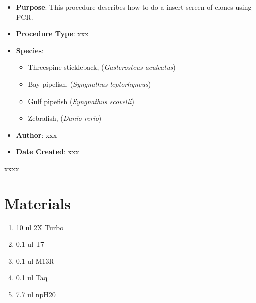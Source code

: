 \documentclass[
  letterpaper,
  DIV=11,
  numbers=noendperiod]{scrreprt}
\providecommand{\tightlist}{%
  \setlength{\itemsep}{0pt}\setlength{\parskip}{0pt}}\usepackage{longtable,booktabs,array}
\begin{document}
\begin{itemize}
\tightlist
\item
  \textbf{Purpose}: This procedure describes how to do a insert screen
  of clones using PCR.
\item
  \textbf{Procedure Type}: xxx
\item
  \textbf{Species}:

  \begin{itemize}
  \tightlist
  \item
    Threespine stickleback, (\emph{Gasterosteus aculeatus})
  \item
    Bay pipefish, (\emph{Syngnathus leptorhyncus})
  \item
    Gulf pipefish (\emph{Syngnathus scovelli})
  \item
    Zebrafish, (\emph{Danio rerio})
  \end{itemize}
\item
  \textbf{Author}: xxx
\item
  \textbf{Date Created}: xxx
\end{itemize}

\begin{tcolorbox}[enhanced jigsaw, toprule=.15mm, breakable, coltitle=black, leftrule=.75mm, title=\textcolor{quarto-callout-warning-color}{\faExclamationTriangle}\hspace{0.5em}{NOTES}, bottomrule=.15mm, toptitle=1mm, bottomtitle=1mm, colframe=quarto-callout-warning-color-frame, opacityback=0, colback=white, opacitybacktitle=0.6, colbacktitle=quarto-callout-warning-color!10!white, rightrule=.15mm, titlerule=0mm, arc=.35mm, left=2mm]

xxxx

\end{tcolorbox}

\hypertarget{materials-21}{%
\section{Materials}\label{materials-21}}

\begin{enumerate}
\def\labelenumi{\arabic{enumi}.}
\tightlist
\item
  10 ul 2X Turbo
\item
  0.1 ul T7
\item
  0.1 ul M13R
\item
  0.1 ul Taq
\item
  7.7 ul npH20
\end{enumerate}
\end{document}
